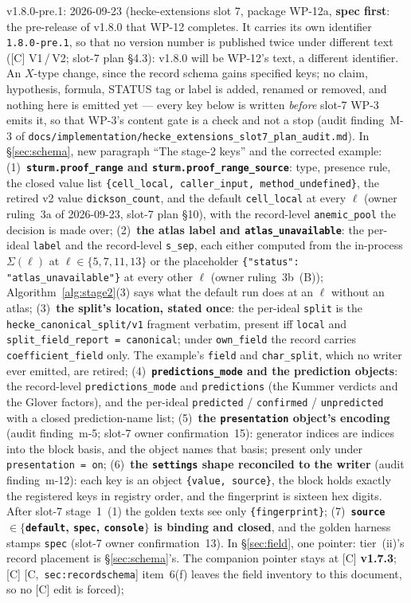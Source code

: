 \documentclass[11pt]{article}
\theoremstyle{remark}
\newcommand{\HA}[1]{[C,~\texttt{#1}]}      %
\begin{document}
v1.8.0-pre.1: 2026-09-23 (hecke-extensions slot 7, package WP-12a, \textbf{spec
first}: the pre-release of v1.8.0 that WP-12 completes. It carries its own identifier
\texttt{1.8.0-pre.1}, so that no version number is published twice under different text ([C]
V1\,/\,V2; slot-7 plan \S4.3): v1.8.0 will be WP-12's text, a different identifier. An $X$-type
change, since the record schema gains specified keys; no claim, hypothesis, formula, STATUS tag
or label is added, renamed or removed, and nothing here is emitted yet --- every key below is
written \emph{before} slot-7 WP-3 emits it, so that WP-3's content gate is a check and not a stop
(audit finding~M-3 of \texttt{docs/implementation/hecke\_extensions\_slot7\_plan\_audit.md}).
In \S\ref{sec:schema}, new paragraph ``The stage-2 keys'' and the corrected example:
(1)~\textbf{\texttt{sturm.proof\_range} and \texttt{sturm.proof\_range\_source}}: type, presence
rule, the closed value list \texttt{\{cell\_local, caller\_input, method\_undefined\}}, the
retired v2 value \texttt{dickson\_count}, and the default \texttt{cell\_local} at every $\ell$
(owner ruling~3a of 2026-09-23, slot-7 plan \S10), with the record-level
\texttt{anemic\_pool} the decision is made over;
(2)~\textbf{the atlas label and \texttt{atlas\_unavailable}}: the per-ideal \texttt{label} and
the record-level \texttt{s\_sep}, each either computed from the in-process $\Sigma(\ell)$ at
$\ell\in\{5,7,11,13\}$ or the placeholder \texttt{\{"status": "atlas\_unavailable"\}} at every
other $\ell$ (owner ruling~3b~(B)); Algorithm~\ref{alg:stage2}(3) says what the default run does
at an $\ell$ without an atlas;
(3)~\textbf{the split's location, stated once}: the per-ideal \texttt{split} is the
\texttt{hecke\_canonical\_split/v1} fragment verbatim, present iff \texttt{local} and
\texttt{split\_field\_report = canonical}; under \texttt{own\_field} the record carries
\texttt{coefficient\_field} only. The example's \texttt{field} and \texttt{char\_split}, which
no writer ever emitted, are retired;
(4)~\textbf{\texttt{predictions\_mode} and the prediction objects}: the record-level
\texttt{predictions\_mode} and \texttt{predictions} (the Kummer verdicts and the Glover factors),
and the per-ideal \texttt{predicted} / \texttt{confirmed} / \texttt{unpredicted} with a closed
prediction-name list;
(5)~\textbf{the \texttt{presentation} object's encoding} (audit finding~m-5; slot-7 owner
confirmation~15): generator indices are indices into the block basis, and the object names that
basis; present only under \texttt{presentation = on};
(6)~\textbf{the \texttt{settings} shape reconciled to the writer} (audit finding~m-12): each key
is an object \texttt{\{value, source\}}, the block holds exactly the registered keys in registry
order, and the fingerprint is sixteen hex digits. After slot-7 stage~1~(1) the golden texts see
only \texttt{\{fingerprint\}};
(7)~\textbf{\texttt{source} $\in\{$\texttt{default}, \texttt{spec}, \texttt{console}$\}$ is
binding and closed}, and the golden harness stamps \texttt{spec} (slot-7 owner confirmation~13).
In \S\ref{sec:field}, one pointer: tier~(ii)'s record placement is \S\ref{sec:schema}'s.
The companion pointer stays at [C] \textbf{v1.7.3}; [C] \HA{sec:recordschema} item~6(f) leaves the
field inventory to this document, so no [C] edit is forced);
\end{document}
